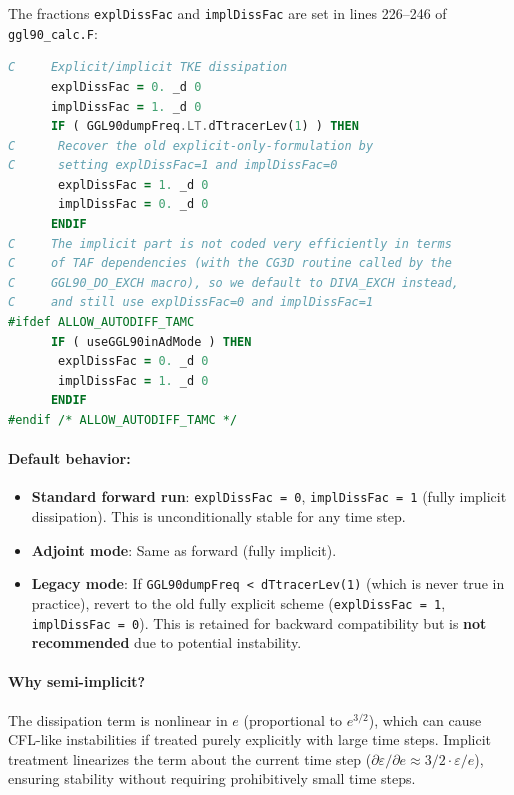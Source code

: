 \documentclass[12pt,letterpaper]{article}
\begin{document}
The fractions \verb|explDissFac| and \verb|implDissFac| are set in lines 226--246 of \verb|ggl90_calc.F|:

\begin{lstlisting}[language=Fortran,caption={(ggl90\_calc.F:L226--246) Explicit/implicit dissipation fractions}]
C     Explicit/implicit TKE dissipation
      explDissFac = 0. _d 0
      implDissFac = 1. _d 0
      IF ( GGL90dumpFreq.LT.dTtracerLev(1) ) THEN
C      Recover the old explicit-only-formulation by
C      setting explDissFac=1 and implDissFac=0
       explDissFac = 1. _d 0
       implDissFac = 0. _d 0
      ENDIF
C     The implicit part is not coded very efficiently in terms
C     of TAF dependencies (with the CG3D routine called by the
C     GGL90_DO_EXCH macro), so we default to DIVA_EXCH instead,
C     and still use explDissFac=0 and implDissFac=1
#ifdef ALLOW_AUTODIFF_TAMC
      IF ( useGGL90inAdMode ) THEN
       explDissFac = 0. _d 0
       implDissFac = 1. _d 0
      ENDIF
#endif /* ALLOW_AUTODIFF_TAMC */
\end{lstlisting}

\paragraph{Default behavior:}
\begin{itemize}
\item \textbf{Standard forward run}: \verb|explDissFac = 0|, \verb|implDissFac = 1| (fully implicit dissipation). This is unconditionally stable for any time step.
\item \textbf{Adjoint mode}: Same as forward (fully implicit).
\item \textbf{Legacy mode}: If \verb|GGL90dumpFreq < dTtracerLev(1)| (which is never true in practice), revert to the old fully explicit scheme (\verb|explDissFac = 1|, \verb|implDissFac = 0|). This is retained for backward compatibility but is \textbf{not recommended} due to potential instability.
\end{itemize}

\paragraph{Why semi-implicit?} The dissipation term is nonlinear in $e$ (proportional to $e^{3/2}$), which can cause CFL-like instabilities if treated purely explicitly with large time steps. Implicit treatment linearizes the term about the current time step ($\partial \varepsilon / \partial e \approx 3/2 \cdot \varepsilon / e$), ensuring stability without requiring prohibitively small time steps.
\end{document}
